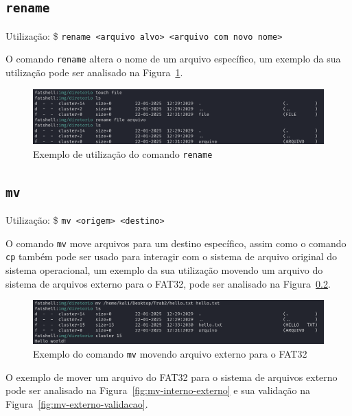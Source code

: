 \documentclass[
    12pt,				%
    oneside,   	        %
    a4paper,			%
    english,			%
    french,				%
    spanish,			%
    brazil,				%
    ]{pacotes/abntex2}
\begin{document}

\subsection{\texttt{rename}}
\label{subsec:rename}
Utilização: \$ \texttt{rename <arquivo alvo> <arquivo com novo nome>}

O comando \texttt{rename} altera o nome de um arquivo específico, um exemplo da sua utilização pode ser analisado na Figura~\ref{fig:rename}.

\begin{figure}[H]
    \centering
    \includegraphics[width=450pt]{figuras/resultados/11-rename.PNG}
    \caption{Exemplo de utilização do comando \texttt{rename}}
    \label{fig:rename}
\end{figure}


\subsection{\texttt{mv}}
\label{subsec:mv}
Utilização: \$ \texttt{mv <origem> <destino>}

O comando \texttt{mv} move arquivos para um destino específico, assim como o comando \texttt{cp} também pode ser usado para interagir com o sistema de arquivo original do sistema operacional, um exemplo da sua utilização movendo um arquivo do sistema de arquivos externo para o FAT32, pode ser analisado na Figura~\ref{subsec:mv}.

\begin{figure}[H]
    \centering
    \includegraphics[width=450pt]{figuras/resultados/12-mv-externo-iterno.PNG}
    \caption{Exemplo do comando \texttt{mv} movendo arquivo externo para o FAT32}
    \label{fig:mv-externo-interno}
\end{figure}

O exemplo de mover um arquivo do FAT32 para o sistema de arquivos externo pode ser analisado na Figura~\ref{fig:mv-interno-externo} e sua validação na Figura~\ref{fig:mv-externo-validacao}.
\end{document}
